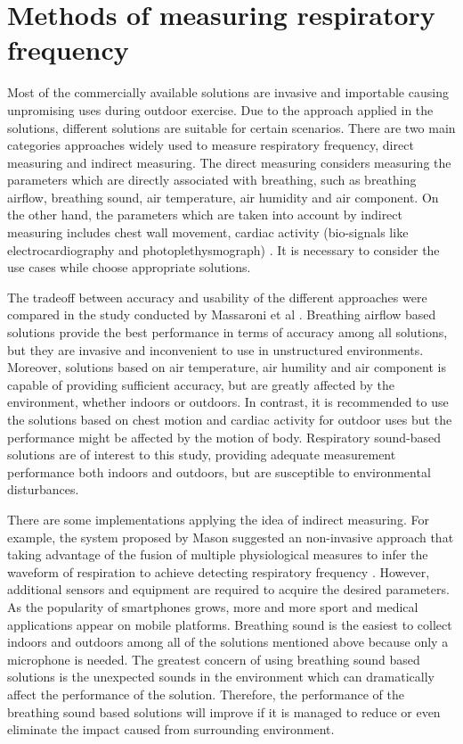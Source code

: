 \section{Methods of measuring respiratory frequency}
Most of the commercially available solutions are invasive and importable causing unpromising uses during outdoor exercise. Due to the approach applied in the solutions, different solutions are suitable for certain scenarios. There are two main categories approaches widely used to measure respiratory frequency, direct measuring and indirect measuring. The direct measuring considers measuring the parameters which are directly associated with breathing, such as breathing airflow, breathing sound, air temperature, air humidity and air component. On the other hand, the parameters which are taken into account by indirect measuring includes chest wall movement, cardiac activity (bio-signals like electrocardiography and photoplethysmograph) \cite{Massaroni2019Contact-BasedRate}. It is necessary to consider the use cases while choose appropriate solutions.

The tradeoff between accuracy and usability of the different approaches were compared in the study conducted by Massaroni et al \cite{Massaroni2019Contact-BasedRate}. Breathing airflow based solutions provide the best performance in terms of accuracy among all solutions, but they are invasive and inconvenient to use in unstructured environments. Moreover, solutions based on air temperature, air humility and air component  is capable of providing sufficient accuracy, but are greatly affected by the environment, whether indoors or outdoors. In contrast, it is recommended to use the solutions based on chest motion and cardiac activity for outdoor uses but the performance might be affected by the motion of body. Respiratory sound-based solutions are of interest to this study, providing adequate measurement performance both indoors and outdoors, but are susceptible to environmental disturbances. 

There are some implementations applying the idea of indirect measuring. For example, the system proposed by Mason suggested an non-invasive approach that taking advantage of the fusion of multiple physiological measures to infer the waveform of respiration to achieve detecting respiratory frequency \cite{Mason2002SignalMonitoring}. However, additional sensors and equipment are required to acquire the desired parameters. As the popularity of smartphones grows, more and more sport and medical applications appear on mobile platforms. Breathing sound is the easiest to collect indoors and outdoors among all of the solutions mentioned above because only a microphone is needed. The greatest concern of using breathing sound based solutions is the unexpected sounds in the environment which can dramatically affect the performance of the solution. Therefore, the performance of the breathing sound based solutions will improve if it is managed to reduce or even eliminate the impact caused from surrounding environment.

